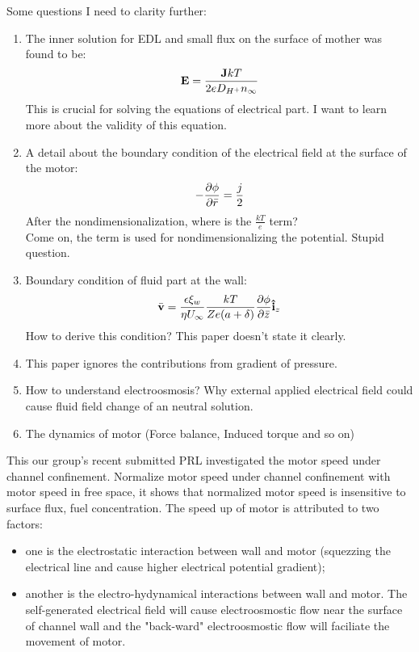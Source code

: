 \documentclass[fontsize=11pt, %
                             paper=a4, %
                             twoside, %
                             captions=tableheading,
                             index=totoc,
                             hyperref]{labbook}
\begin{document}
\begin{addmargin}[4cm]{0cm}
Some questions I need to clarity further:
\begin{enumerate}
\item
The inner solution for EDL and small flux on the surface of mother was found to be\cite{Kline2006}:
\begin{equation}
\mathbf{E} = \frac{\mathbf{J} k T}{2e D_{H^+}n_\infty}
\end{equation}
This is crucial for solving the equations of electrical part. I want to learn more about the validity of this equation.
\item
A detail about the boundary condition of the electrical field at the surface of the motor:
\begin{equation}
-\frac{\partial \phi}{\partial \bar{r}}=\frac{j}{2}
\end{equation}
After the nondimensionalization, where is the $\frac{kT}{e}$ term?\\
Come on, the term is used for nondimensionalizing the potential. Stupid question.
\item
Boundary condition of fluid part at the wall:
\begin{equation}
\bar{\mathbf{v}}=\frac{\epsilon\xi_w}{\eta U_\infty}\frac{kT}{Ze(a+\delta)}\frac{\partial \phi}{\partial \bar z}\mathbf{\hat{i}}_z
\end{equation}
How to derive this condition? This paper doesn't state it clearly.
\item
This paper ignores the contributions from gradient of pressure. 
\item
How to understand electroosmosis? Why external applied electrical field could cause fluid field change of an neutral solution.
\item
The dynamics of motor (Force balance, Induced torque and so on)
\end{enumerate}  
This our group's recent submitted PRL\cite{Liu2016} investigated the motor speed under channel confinement. Normalize motor speed under channel confinement with motor speed in free space, it shows that normalized motor speed is insensitive to surface flux, fuel concentration. The speed up of motor is attributed to two factors: 
\begin{itemize}
\item one is the electrostatic interaction between wall and motor (squezzing the electrical line and cause higher electrical potential gradient);
\item another is the electro-hydynamical interactions between wall and motor. The self-generated electrical field will cause electroosmostic flow near the surface of channel wall and the "back-ward" electroosmostic flow will faciliate the movement of motor.

\end{itemize}
\end{addmargin}
\end{document}
